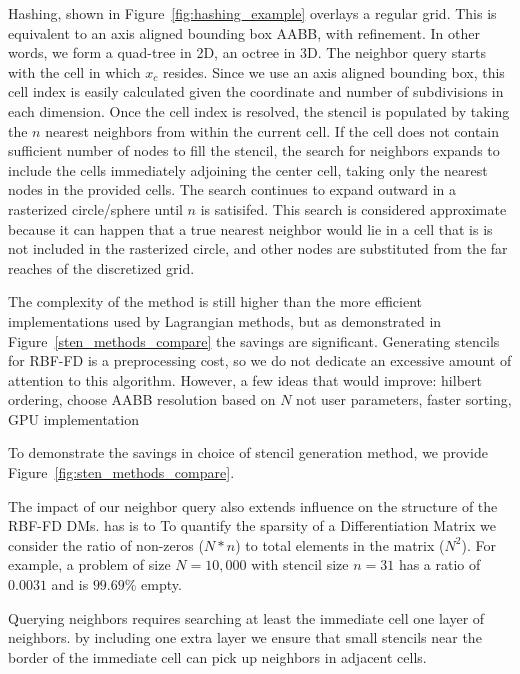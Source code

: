 \documentclass[11pt]{report}
\begin{document}
{Hashing, shown in Figure~\ref{fig:hashing_example} overlays a regular grid. This is equivalent to an axis aligned bounding box AABB, with refinement. In other words, we form a quad-tree in 2D, an octree in 3D. The neighbor query starts with the cell in which $x_c$ resides. Since we use an axis aligned bounding box, this cell index is easily calculated given the coordinate and number of subdivisions in each dimension. Once the cell index is resolved, the stencil is populated by taking the $n$ nearest neighbors from within the current cell. If the cell does not contain sufficient number of nodes to fill the stencil, the search for neighbors expands to include the cells immediately adjoining the center cell, taking only the nearest nodes in the provided cells. The search continues to expand outward in a rasterized circle/sphere until $n$ is satisifed. This search is considered approximate because it can happen that a true nearest neighbor would lie in a cell that is is not included in the rasterized circle, and other nodes are substituted from the far reaches of the discretized grid.

The complexity of the method is still higher than the more efficient implementations used by Lagrangian methods, but as demonstrated in Figure~\ref{sten_methods_compare} the savings are significant. Generating stencils for RBF-FD is a preprocessing cost, so we do not dedicate an excessive amount of attention to this algorithm. However, a few ideas that would improve: hilbert ordering, choose AABB resolution based on $N$ not user parameters, faster sorting, GPU implementation


To demonstrate the savings in choice of stencil generation method, we provide Figure~\ref{fig:sten_methods_compare}. 
 

The impact of our neighbor query also extends influence on the structure of the RBF-FD DMs.
has is to To quantify the sparsity of a Differentiation Matrix we consider the ratio of non-zeros ($N*n$) to total elements in the matrix ($N^2$). For example, a problem of size $N = 10,000$ with stencil size $n=31$ has a ratio of $0.0031$ and is $99.69\%$ empty. 

Querying neighbors requires searching at least the immediate cell one layer of neighbors. by including one extra layer we ensure that small stencils near the border of the immediate cell can pick up neighbors in adjacent cells.



}
\end{document}
